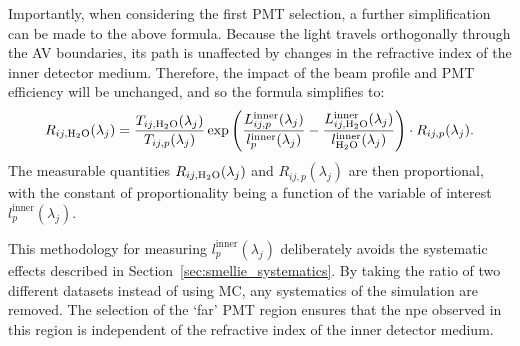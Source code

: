 Importantly, when considering the first PMT selection, a further simplification can be made to the above formula. Because the light travels orthogonally through the AV boundaries, its path is unaffected by changes in the refractive index of the inner detector medium. Therefore, the impact of the beam profile and PMT efficiency will be unchanged, and so the formula simplifies to:
\begin{equation}\label{eq:smellie_ext_length_rsrw_formula_1PMT}
    R_{ij,\ce{H_{2}O}}(\lambda_{j}) = 
    \frac{T_{ij,\ce{H_{2}O}}(\lambda_{j})}{T_{ij,p}(\lambda_{j})}
    \exp\left(
        \frac{L_{ij,p}^{\mathrm{inner}}(\lambda_{j})}{l_{p}^{\mathrm{inner}}(\lambda_{j})}
        -\frac{L_{ij,\ce{H_{2}O}}^{\mathrm{inner}}(\lambda_{j})}{l_{\ce{H_{2}O}}^{\mathrm{inner}}(\lambda_{j})}
    \right)
    \cdot  R_{ij,p}(\lambda_{j}).
\end{equation}
The measurable quantities $R_{ij,\ce{H_{2}O}}(\lambda_{j})$ and $R_{ij,p}(\lambda_{j})$ are then proportional, with the constant of proportionality being a function of the variable of interest $l_{p}^{\mathrm{inner}}(\lambda_{j})$.

This methodology for measuring $l_{p}^{\mathrm{inner}}(\lambda_{j})$ deliberately avoids the systematic effects described in Section~\ref{sec:smellie_systematics}. By taking the ratio of two different datasets instead of using MC, any systematics of the simulation are removed. The selection of the `far' PMT region ensures that the npe observed in this region is independent of the refractive index of the inner detector medium.

